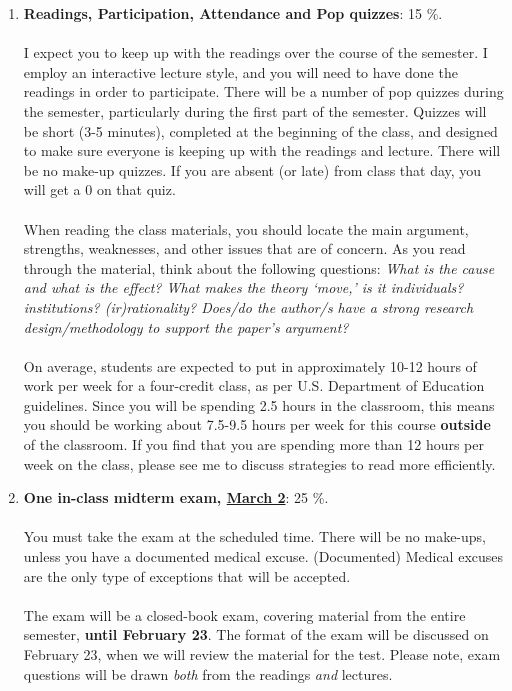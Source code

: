 \documentclass[letterpaper]{article}
\begin{document}
\begin{enumerate}

	\item {\bf Readings, Participation, Attendance and Pop quizzes}: 15 \%.
	\\
	\\
	I expect you to keep up with the readings over the course of the semester. I employ an interactive lecture style, and you will need to have done the readings in order to participate. There will be a number of pop quizzes during the semester, particularly during the first part of the semester.  Quizzes will be short (3-5 minutes), completed at the beginning of the class, and designed to make sure everyone is keeping up with the readings and lecture. There will be no make-up quizzes. If you are absent (or late) from class that day, you will get a $0$ on that quiz. 
	\\
	\\
	When reading the class materials, you should locate the main argument, strengths, weaknesses, and other issues that are of concern. As you read through the material, think about the following questions: \emph{What is the cause and what is the effect? What makes the theory `move,' is it individuals? institutions? (ir)rationality? Does/do the author/s have a strong research design/methodology to support the paper's argument?} 
	\\
	\\
	On average, students are expected to put in approximately 10-12 hours of work per week for a four-credit class, as per U.S. Department of Education guidelines.  Since you will be spending 2.5 hours in the classroom, this means you should be working about 7.5-9.5 hours per week for this course {\bf outside} of the classroom. If you find that you are spending more than 12 hours per week on the class, please see me to discuss strategies to read more efficiently. 


	\item {\bf One in-class midterm exam, \underline{March 2}}: 25 \%. 
	\\
	\\
	You must take the exam at the scheduled time. There will be no make-ups, unless you have a documented medical excuse. (Documented) Medical excuses are the only type of exceptions that will be accepted.
	\\
	\\
	The exam will be a closed-book exam, covering material from the entire semester, {\bf until February 23}. The format of the exam will be discussed on February 23, when we will review the material for the test. Please note, exam questions will be drawn \emph{both} from the readings \emph{and} lectures.



\end{enumerate}
\end{document}
